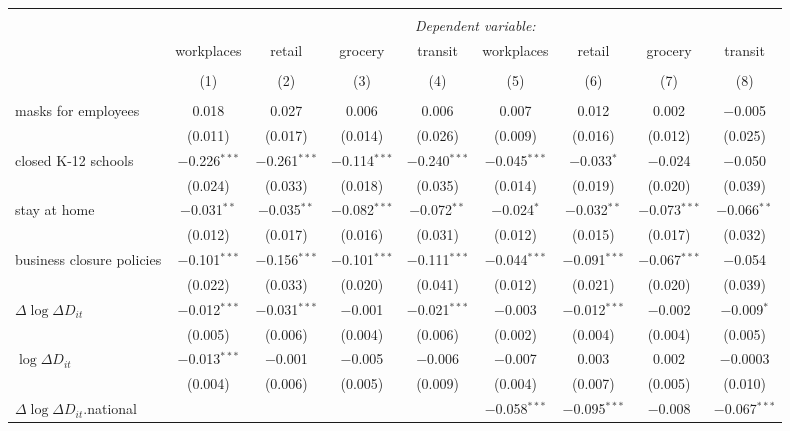 \begin{tabular}{@{\extracolsep{1pt}}lcccccccc} 
\\[-1.8ex]\hline 
\hline \\[-1.8ex] 
 & \multicolumn{8}{c}{\textit{Dependent variable:}} \\ 
\cline{2-9} 
 & workplaces & retail & grocery & transit & workplaces & retail & grocery & transit \\ 
\\[-1.8ex] & (1) & (2) & (3) & (4) & (5) & (6) & (7) & (8)\\ 
\hline \\[-1.8ex] 
 masks for employees & 0.018 & 0.027 & 0.006 & 0.006 & 0.007 & 0.012 & 0.002 & $-$0.005 \\ 
  & (0.011) & (0.017) & (0.014) & (0.026) & (0.009) & (0.016) & (0.012) & (0.025) \\ 
  closed K-12 schools & $-$0.226$^{***}$ & $-$0.261$^{***}$ & $-$0.114$^{***}$ & $-$0.240$^{***}$ & $-$0.045$^{***}$ & $-$0.033$^{*}$ & $-$0.024 & $-$0.050 \\ 
  & (0.024) & (0.033) & (0.018) & (0.035) & (0.014) & (0.019) & (0.020) & (0.039) \\ 
  stay at home & $-$0.031$^{**}$ & $-$0.035$^{**}$ & $-$0.082$^{***}$ & $-$0.072$^{**}$ & $-$0.024$^{*}$ & $-$0.032$^{**}$ & $-$0.073$^{***}$ & $-$0.066$^{**}$ \\ 
  & (0.012) & (0.017) & (0.016) & (0.031) & (0.012) & (0.015) & (0.017) & (0.032) \\ 
  business closure policies & $-$0.101$^{***}$ & $-$0.156$^{***}$ & $-$0.101$^{***}$ & $-$0.111$^{***}$ & $-$0.044$^{***}$ & $-$0.091$^{***}$ & $-$0.067$^{***}$ & $-$0.054 \\ 
  & (0.022) & (0.033) & (0.020) & (0.041) & (0.012) & (0.021) & (0.020) & (0.039) \\ 
  $\Delta \log \Delta D_{it}$ & $-$0.012$^{***}$ & $-$0.031$^{***}$ & $-$0.001 & $-$0.021$^{***}$ & $-$0.003 & $-$0.012$^{***}$ & $-$0.002 & $-$0.009$^{*}$ \\ 
  & (0.005) & (0.006) & (0.004) & (0.006) & (0.002) & (0.004) & (0.004) & (0.005) \\ 
  $\log \Delta D_{it}$ & $-$0.013$^{***}$ & $-$0.001 & $-$0.005 & $-$0.006 & $-$0.007 & 0.003 & 0.002 & $-$0.0003 \\ 
  & (0.004) & (0.006) & (0.005) & (0.009) & (0.004) & (0.007) & (0.005) & (0.010) \\ 
  $\Delta \log \Delta D_{it}$.national &  &  &  &  & $-$0.058$^{***}$ & $-$0.095$^{***}$ & $-$0.008 & $-$0.067$^{***}$ \\ 

\end{tabular}
